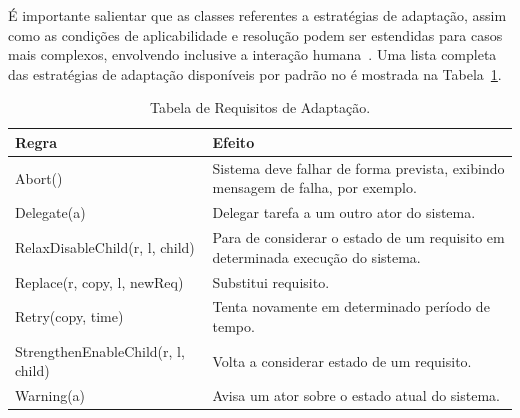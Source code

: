 É importante salientar que as classes referentes a estratégias de adaptação, assim como as condições de aplicabilidade e resolução podem ser estendidas para casos mais complexos, envolvendo inclusive a interação humana~\cite{tesevitor}. Uma lista completa das estratégias de adaptação disponíveis por padrão no \zanshin é mostrada na Tabela~\ref{awreqs-zanshin}.

\begin{table}
	\centering
	\caption{Tabela de Requisitos de Adaptação.}
	\label{awreqs-zanshin}
	\begin{tabularx}{\textwidth}{|l|X|}
		\hline
		\textbf{Regra}                              & \textbf{Efeito}                                                                          \\ \hline
		Abort()                            & Sistema deve falhar de forma prevista, exibindo mensagem de falha, por exemplo. \\ \hline
		Delegate(a)                        & Delegar tarefa a um outro ator do sistema.                                      \\ \hline
		RelaxDisableChild(r, l, child)     & Para de considerar o estado de um requisito em determinada execução do sistema. \\ \hline
		Replace(r, copy, l, newReq)        & Substitui requisito.                                                            \\ \hline
		Retry(copy, time)                  & Tenta novamente em determinado período de tempo.                                \\ \hline
		StrengthenEnableChild(r, l, child) & Volta a considerar estado de um requisito.                                      \\ \hline
		Warning(a)                         & Avisa um ator sobre o estado atual do sistema.                                  \\ \hline
	\end{tabularx}
\end{table}


